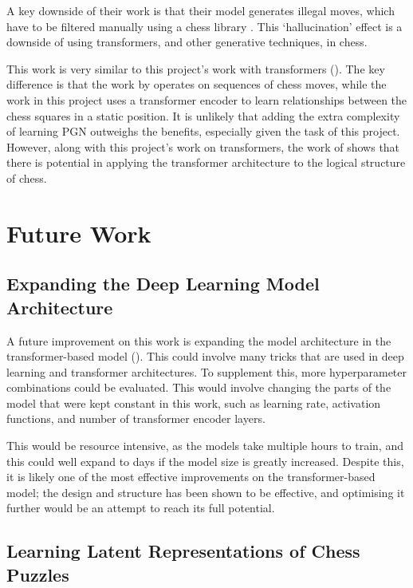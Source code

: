 A key downside of their work is that their model generates illegal moves, which
have to be filtered manually using a chess library \citep{chessTransformer}.
This `hallucination' effect is a downside of using transformers, and other
generative techniques, in chess. 

This work is very similar to this project's work with transformers
(). The key difference is that the work by
\citet{chessTransformer} operates on sequences of chess moves, while the work
in this project uses a transformer encoder to learn relationships between the
chess squares in a static position. It is unlikely that adding the extra
complexity of learning PGN outweighs the benefits, especially given the task of
this project. However, along with this project's work on transformers, the work
of \citet{chessTransformer} shows that there is potential in applying the
transformer architecture to the logical structure of chess.

\section{Future Work}\label{concS2}

\subsection{Expanding the Deep Learning Model Architecture}

A future improvement on this work is expanding the model architecture in the
transformer-based model (). This could involve many tricks that are
used in deep learning and transformer architectures. To supplement this, more
hyperparameter combinations could be evaluated. This would involve changing the
parts of the model that were kept constant in this work, such as learning rate,
activation functions, and number of transformer encoder layers.

This would be resource intensive, as the models take multiple hours to train,
and this could well expand to days if the model size is greatly increased.
Despite this, it is likely one of the most effective improvements on the
transformer-based model; the design and structure has been shown to be
effective, and optimising it further would be an attempt to reach its full
potential.

\subsection{Learning Latent Representations of Chess Puzzles}

